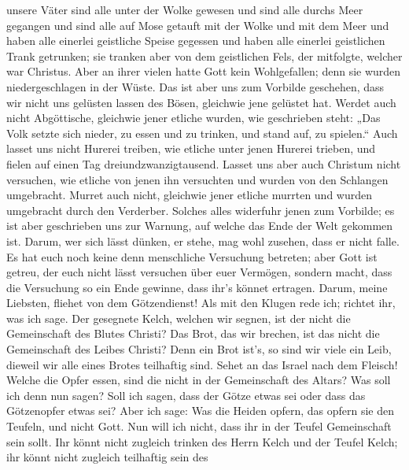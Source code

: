 unsere Väter sind alle unter der Wolke gewesen und sind alle durchs Meer
gegangen  und sind alle auf Mose getauft mit der Wolke und
mit dem Meer  und haben alle einerlei geistliche Speise
gegessen  und haben alle einerlei geistlichen Trank
getrunken; sie tranken aber von dem geistlichen Fels, der mitfolgte,
welcher war Christus.  Aber an ihrer vielen hatte Gott kein
Wohlgefallen; denn sie wurden niedergeschlagen in der Wüste.
 Das ist aber uns zum Vorbilde geschehen, dass wir nicht uns
gelüsten lassen des Bösen, gleichwie jene gelüstet hat. 
Werdet auch nicht Abgöttische, gleichwie jener etliche wurden, wie
geschrieben steht: „Das Volk setzte sich nieder, zu essen und zu
trinken, und stand auf, zu spielen.``  Auch lasset uns nicht
Hurerei treiben, wie etliche unter jenen Hurerei trieben, und fielen auf
einen Tag dreiundzwanzigtausend.  Lasset uns aber auch
Christum nicht versuchen, wie etliche von jenen ihn versuchten und
wurden von den Schlangen umgebracht.  Murret auch nicht,
gleichwie jener etliche murrten und wurden umgebracht durch den
Verderber.  Solches alles widerfuhr jenen zum Vorbilde; es
ist aber geschrieben uns zur Warnung, auf welche das Ende der Welt
gekommen ist.  Darum, wer sich lässt dünken, er stehe, mag
wohl zusehen, dass er nicht falle.  Es hat euch noch keine
denn menschliche Versuchung betreten; aber Gott ist getreu, der euch
nicht lässt versuchen über euer Vermögen, sondern macht, dass die
Versuchung so ein Ende gewinne, dass ihr's könnet ertragen.
 Darum, meine Liebsten, fliehet von dem Götzendienst!
 Als mit den Klugen rede ich; richtet ihr, was ich sage.
 Der gesegnete Kelch, welchen wir segnen, ist der nicht die
Gemeinschaft des Blutes Christi? Das Brot, das wir brechen, ist das
nicht die Gemeinschaft des Leibes Christi?  Denn ein Brot
ist's, so sind wir viele ein Leib, dieweil wir alle eines Brotes
teilhaftig sind.  Sehet an das Israel nach dem Fleisch!
Welche die Opfer essen, sind die nicht in der Gemeinschaft des Altars?
 Was soll ich denn nun sagen? Soll ich sagen, dass der
Götze etwas sei oder dass das Götzenopfer etwas sei?  Aber
ich sage: Was die Heiden opfern, das opfern sie den Teufeln, und nicht
Gott. Nun will ich nicht, dass ihr in der Teufel Gemeinschaft sein
sollt.  Ihr könnt nicht zugleich trinken des Herrn Kelch
und der Teufel Kelch; ihr könnt nicht zugleich teilhaftig sein des
